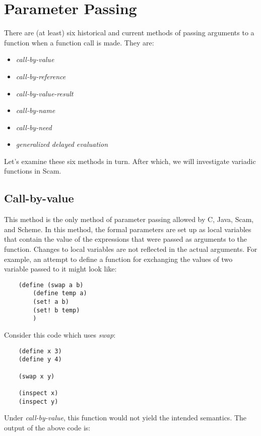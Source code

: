 \chapter{Parameter Passing}
\label{ParameterPassing}

There are (at least) six historical and current
methods of passing arguments to a function when a function call
is made. They are:

\begin{itemize}
\item
    {\it call-by-value}
\item
    {\it call-by-reference}
\item
    {\it call-by-value-result}
\item
    {\it call-by-name}
\item
    {\it call-by-need}
\item
    {\it generalized delayed evaluation}
\end{itemize}

Let's examine these six methods in turn. After which, we will
investigate variadic functions in Scam.

\section*{Call-by-value}

This method is the only method of parameter passing allowed by C, Java,
Scam, and Scheme. In this method, the formal parameters are set up as local
variables that contain the value of the expressions that were passed as
arguments to the function. Changes to local variables are not reflected
in the actual arguments. For example, an attempt to define a function
for exchanging the values
of two variable passed to it might look like:

\begin{verbatim}
    (define (swap a b)
        (define temp a)
        (set! a b)
        (set! b temp)
        )
\end{verbatim}

Consider this code which uses {\it swap}:

\begin{verbatim}
    (define x 3)
    (define y 4)

    (swap x y)

    (inspect x)
    (inspect y)
\end{verbatim}

Under {\it call-by-value},
this function would not yield the intended semantics.
The output of the above code is:

